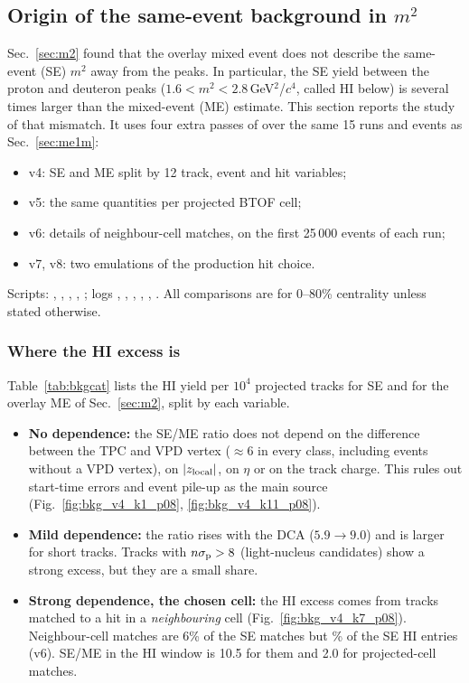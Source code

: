 \subsection{Origin of the same-event background in $m^2$}
\label{sec:bkg}

Sec.~\ref{sec:m2} found that the overlay mixed event does not describe the same-event (SE) $m^2$ away from the peaks.
In particular, the SE yield between the proton and deuteron peaks ($1.6<m^2<2.8$\,GeV$^2$/$c^4$, called HI below)
is several times larger than the mixed-event (ME) estimate. This section reports the study of that mismatch.
It uses four extra passes of  over the same 15 runs and events as Sec.~\ref{sec:me1m}:
\begin{itemize}
\item v4: SE and ME split by 12 track, event and hit variables;
\item v5: the same quantities per projected BTOF cell;
\item v6: details of neighbour-cell matches, on the first 25\,000 events of each run;
\item v7, v8: two emulations of the production hit choice.
\end{itemize}
Scripts: , , , , ;
logs , , , , ,
. All comparisons are for 0--80\% centrality unless stated otherwise.

\subsubsection{Where the HI excess is}
Table~\ref{tab:bkgcat} lists the HI yield per $10^4$ projected tracks for SE and for the overlay ME of
Sec.~\ref{sec:m2}, split by each variable.
\begin{itemize}
\item \textbf{No dependence:} the SE/ME ratio does not depend on the difference between the TPC and VPD vertex
  ($\approx6$ in every class, including events without a VPD vertex), on $|z_{\rm local}|$, on $\eta$ or on the track
  charge. This rules out start-time errors and event pile-up as the main source
  (Fig.~\ref{fig:bkg_v4_k1_p08}, \ref{fig:bkg_v4_k11_p08}).
\item \textbf{Mild dependence:} the ratio rises with the DCA ($5.9\to9.0$) and is larger for short tracks.
  Tracks with $n\sigma_{\rm p}>8$ (light-nucleus candidates) show a strong excess, but they are a small share.
\item \textbf{Strong dependence, the chosen cell:} the HI excess comes from tracks matched to a hit in a
  \emph{neighbouring} cell (Fig.~\ref{fig:bkg_v4_k7_p08}). Neighbour-cell matches are 6\% of the SE matches but
  \nbShareHI\% of the SE HI entries (v6). SE/ME in the HI window is 10.5 for them and 2.0 for projected-cell matches.
\end{itemize}

